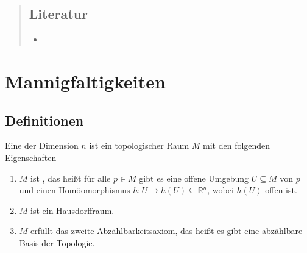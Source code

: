 
\newcommand{\fach}{Differentialtopologie}
\newcommand{\semester}{SoSe 2017}
\newcommand{\homepage}{https://ivv5hpp.uni-muenster.de/u/jeber_02/sommer17/differentialtopologie.html}

\newcommand{\prof}{Prof.\ Dr.\ Johannes Ebert}
\publishers{}




\maketitle
\begin{abstract}

\section*{Literatur}
\begin{itemize}
	\item {} \textcite{Miln}
\end{itemize}
\end{abstract}

\tableofcontents
\cleardoubleoddemptypage

\setcounter{page}{1}
\setcounter{footnote}{0}

\chapter{Mannigfaltigkeiten} %
\label{cha:mannigfaltigkeiten}

\section{Definitionen} %
\label{sec:definitionen}

\begin{definition}[{name=[topologische Mannigfaltigkeit]}]
	Eine  der Dimension $n$ ist ein topologischer Raum $M$ mit den folgenden Eigenschaften
	\begin{enumerate}[1)]
		\item $M$ ist , das heißt für alle $p \in M$ gibt es eine offene Umgebung $U \subseteq M$ von $p$ und einen Homöomorphismus $h \colon U \to h(U) \subseteq \mathbb{R}^n$, wobei $h(U)$ offen ist.
		\item $M$ ist ein Hausdorffraum.
		\item $M$ erfüllt das zweite Abzählbarkeitsaxiom, das heißt es gibt eine abzählbare Basis der Topologie.
	\end{enumerate}
\end{definition}


